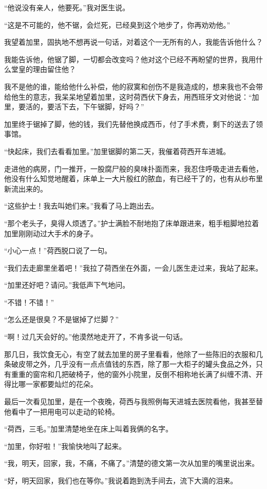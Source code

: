 \par “他说没有亲人，他要死。”我对医生说。
\par “这是不可能的，他不锯，会烂死，已经臭到这个地步了，你再劝劝他。”
\par 我望着加里，固执地不想再说一句话，对着这个一无所有的人，我能告诉他什么？
\par 我能告诉他，他锯了脚，一切都会改变吗？他对这个已经不再盼望的世界，我用什么堂皇的理由留住他？
\par 我不是他的谁，能给他什么补偿，他的寂寞和创伤不是我造成的，想来我也不会带给他生的意志，我呆呆地望着加里，这时荷西伏下身去，用西班牙文对他说：“加里，要活的，要活下去，下午锯脚，好吗？”
\par 加里终于锯掉了脚，他的钱，我们先替他换成西币，付了手术费，剩下的送去了领事馆。
\par “快起床，我们去看看加里。”加里锯脚的第二天，我催着荷西开车进城。
\par 走进他的病房，门一推开，一股腐尸般的臭味扑面而来，我忍住呼吸走进去看他，他没有什么知觉地醒着，床单上一大片殷红的脓血，有已经干了的，也有从纱布里新流出来的。
\par “这些护士！我去叫她们来。”我看了马上跑出去。
\par “那个老头子，臭得人烦透了。”护士满脸不耐地抱了床单跟进来，粗手粗脚地拉着加里刚刚动过大手术的身子。
\par “小心一点！”荷西脱口说了一句。
\par “我们去走廊里坐着吧！”我拉了荷西坐在外面，一会儿医生走过来，我站了起来。
\par “加里还好吧？请问。”我低声下气地问。
\par “不错！不错！”
\par “怎么还是很臭？不是锯掉了烂脚？”
\par “啊！过几天会好的。”他漠然地走开了，不肯多说一句话。
\par 那几日，我饮食无心，有空了就去加里的房子里看看，他除了一些陈旧的衣服和几条破皮带之外，几乎没有一点点值钱的东西，除了那一大柜子的罐头食品之外，只有重重的窗帘和几把破椅子，他的窗外小院里，反倒不相称地长满了纠缠不清、开得比哪一家都要灿烂的花朵。
\par 最后一次看见加里，是在一个夜晚，荷西与我照例每天进城去医院看他，我甚至替他看中了一把用电可以走动的轮椅。
\par “荷西，三毛。”加里清楚地坐在床上叫着我俩的名字。
\par “加里，你好啦！”我愉快地叫了起来。
\par “我，明天，回家，我，不痛，不痛了。”清楚的德文第一次从加里的嘴里说出来。
\par “好，明天回家，我们也在等你。”我说着跑到洗手间去，流下大滴的泪来。
